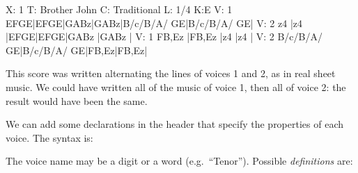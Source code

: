 \documentclass[a4paper,fullpage,12pt]{book}
\begin{document}
\begin{abcsource}
X: 1
T: Brother John
C: Traditional
L: 1/4
K:E
V: 1
EFGE|EFGE|GABz|GABz|B/c/B/A/ GE|B/c/B/A/ GE|
V: 2
z4  |z4  |EFGE|EFGE|GABz       |GABz       |
V: 1
FB,Ez      |FB,Ez      |z4   |z4   |
V: 2
B/c/B/A/ GE|B/c/B/A/ GE|FB,Ez|FB,Ez|
\end{abcsource}


This score was written alternating the lines of voices 1 and 2, as in
real sheet music. We could have written all of the music of voice 1,
then all of voice 2: the result would have been the same.

We can add some declarations in the header that specify the properties
of each voice. The syntax is:

\medskip

   
   
 
 
 
 
 
  

\medskip

The voice name may be a digit or a word (e.g.\ ``Tenor''). Possible
\emph{definitions} are:
\end{document}
